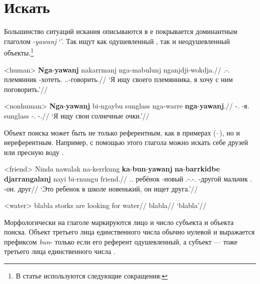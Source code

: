 
\section{Искать}
Большинство ситуаций искания описываются в  е покрывается доминантным глаголом -\textit{yawanj} `\yaw'. Так ищут как одушевленный , так и неодушевленный  объекты.\footnote{В статье используются следующие сокращения: \printglossary[style=inline,type=\leipzigtype]}

\ex<human>\begingl
\gla \textbf{Nga}-\textbf{yawanj} nakarrmanj nga-mabulunj nganjdji-wokdja.//
\glb \Fsg.\Real-\yaw.\Np{} племянник \nga-хотеть.\Np{} \Fdu.\Excl.\Fut-говорить.\Np{}//
\glft `Я ищу своего племянника, я хочу с ним поговорить.'//%
\endgl \xe

\ex<nonhuman> \begingl
\gla \textbf{Nga}-\textbf{yawanj} bi-ngaybu sunglass nga-warre \textbf{nga}-\textbf{yawanj}.//
\glb \nga-\yaw.\Np{} \bi-я.\Obl{} sunglass \nga-\warre.\Np{} \nga-\yaw.\Np{}//
\glft `Я ищу свои солнечные очки.'//%
\endgl \xe

Объект поиска может быть не только референтным, как в примерах (--), но и нереферентным. Например, с помощью этого глагола можно искать себе друзей  или пресную воду .

\ex<friend> \begingl
\gla Ninda nawalak na-kerrkung \textbf{ka}-\textbf{bun}-\textbf{yawanj} \textbf{na}-\textbf{barrkidbe} \textbf{djarrangalanj} nayi bi-rnungu friend.//
\glb \Dem.\Prox.\Cli{} ребёнок \Cli-новый \Tsg.\Real-\Tsg.\Obj-\yaw.\Np{} \Cli-другой мальчик \Nm.\Cli{} \bi-он.\Obl{} друг//
\glft `Это ребенок в школе новенький, он ищет друга.'//%
\endgl \xe

\ex<water>\begingl
\gla blabla storks are looking for water//
\glb blabla//
\glft `blabla'//
\endgl \xe

Морфологически на глаголе маркируются лицо и число субъекта и объекта поиска. Объект третьего лица единственного числа обычно нулевой и выражается префиксом \textit{bun}- только если его референт одушевленный, а субъект --- тоже третьего лица единственного числа . 

